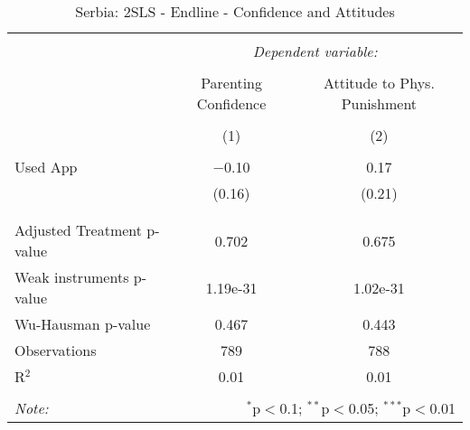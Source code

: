 
\begin{table}[!htbp] \centering 
  \caption{Serbia: 2SLS - Endline - Confidence and Attitudes} 
  \label{tbl:Serbia: 2SLS - Endline - Confidence and Attitudes} 
\begin{tabular}{@{\extracolsep{5pt}}lcc} 
\\[-1.8ex]\hline 
\hline \\[-1.8ex] 
 & \multicolumn{2}{c}{\textit{Dependent variable:}} \\ 
\cline{2-3} 
\\[-1.8ex] & Parenting Confidence & Attitude to Phys. Punishment \\ 
\\[-1.8ex] & (1) & (2)\\ 
\hline \\[-1.8ex] 
 Used App & $-$0.10 & 0.17 \\ 
  & (0.16) & (0.21) \\ 
  & & \\ 
\hline \\[-1.8ex] 
Adjusted Treatment p-value & 0.702 & 0.675 \\ 
Weak instruments p-value & 1.19e-31 & 1.02e-31 \\ 
Wu-Hausman p-value & 0.467 & 0.443 \\ 
Observations & 789 & 788 \\ 
R$^{2}$ & 0.01 & 0.01 \\ 
\hline 
\hline \\[-1.8ex] 
\textit{Note:}  & \multicolumn{2}{r}{$^{*}$p$<$0.1; $^{**}$p$<$0.05; $^{***}$p$<$0.01} \\ 
\end{tabular} 
\end{table} 
